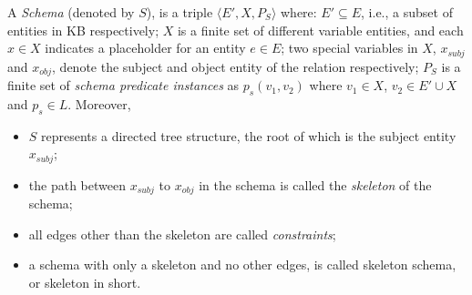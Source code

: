 \begin{definition}
A \textit{Schema} (denoted by $S$), is a triple
$\langle E', X, P_S \rangle$ where:
  $E' \subseteq E$, i.e.,
  a subset of entities in KB respectively;
  $X$ is a finite set of different variable entities, and  each $x \in X$
  indicates a placeholder for an entity $e \in E$;
  two special variables in $X$, $x_{subj}$ and $x_{obj}$, denote the
  subject and object entity of the relation respectively;
  $P_S$ is a finite set of \textit{schema predicate instances} as
  $p_s(v_1, v_2)$ where $v_1 \in X$, $v_2 \in E' \cup X$
  and $p_s \in L$. Moreover,
\begin{itemize}
  \itemsep0em
  \item $S$ represents a directed tree structure, the root of which is
the subject entity $x_{subj}$;
  \item the path between $x_{subj}$  to $x_{obj}$ in the schema is called
	the {\em skeleton} of the schema;
  \item all edges other than the skeleton are called {\em constraints};
  \item a schema with only a skeleton and no other edges, is called
	 skeleton schema, or skeleton in short.
\end{itemize}

\end{definition}
